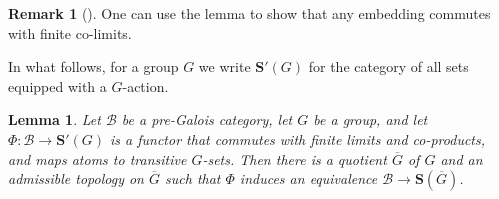 \documentclass[12pt]{amsart}
\numberwithin{equation}{section}
\newtheorem{lemma}[equation]{Lemma}
\theoremstyle{definition}
\newtheorem{rmk}[equation]{Remark}
\newenvironment{remark}[1][]{\begin{rmk}[#1] \pushQED{\qed}}{\popQED \end{rmk}}
\newcommand{\cB}{\mathcal{B}}
\newcommand{\bS}{\mathbf{S}}
\begin{document}
\begin{remark}
One can use the lemma to show that any embedding commutes with finite co-limits.
\end{remark}

In what follows, for a group $G$ we write $\bS'(G)$ for the category of all sets equipped with a $G$-action.

\begin{lemma} \label{lem:uncountable-2}
Let $\cB$ be a pre-Galois category, let $G$ be a group, and let $\Phi \colon \cB \to \bS'(G)$ is a functor that commutes with finite limits and co-products, and maps atoms to transitive $G$-sets. Then there is a quotient $\overline{G}$ of $G$ and an admissible topology on $\overline{G}$ such that $\Phi$ induces an equivalence $\cB \to \bS(\overline{G})$.
\end{lemma}
\end{document}
